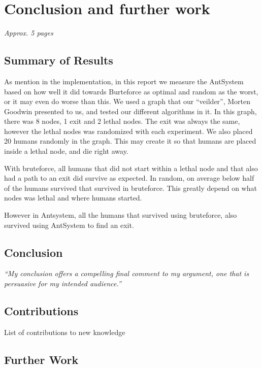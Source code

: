 \chapter{Conclusion and further work}
\label{ch:conclusion}
\textit{Approx. 5 pages}

\section{Summary of Results}

As mention in the implementation, in this report we measure the AntSystem based on how well it did towards Burteforce as optimal and random as the worst, or it may even do worse than this. We used a graph that our “veilder”, Morten Goodwin presented to us, and tested our different algorithms in it. In this graph, there was 8 nodes, 1 exit and 2 lethal nodes. The exit was always the same, however the lethal nodes was randomized with each experiment. We also placed 20 humans randomly in the graph. This may create it so that humans are placed inside a lethal node, and die right away.

With bruteforce, all humans that did not start within a lethal node and that also had a path to an exit did survive as expected. In random, on average below half of the humans survived that survived in bruteforce. This greatly depend on what nodes was lethal and where humans started.

However in Antsystem, all the humans that survived using bruteforce, also survived using AntSystem to find an exit.

\section{Conclusion}
\emph{``My conclusion offers a compelling final comment to my argument, one that is persuasive for my
intended audience.''}

\section{Contributions}
List of contributions to new knowledge

\section{Further Work}